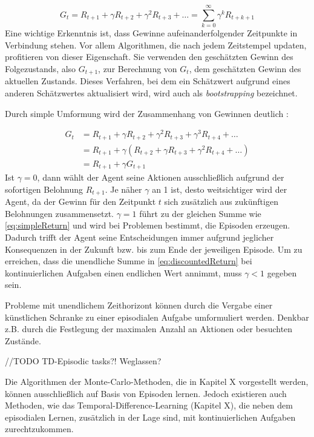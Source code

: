 \begin{equation}\label{eq:discountedReturn}
    G_t = R_{t+1} + \gamma R_{t+2} + \gamma^2 R_{t+3} + \dots  = \sum_{k=0}^\infty{\gamma^k R_{t+k+1}}
\end{equation}
Eine wichtige Erkenntnis ist, dass Gewinne aufeinanderfolgender Zeitpunkte in Verbindung stehen. Vor allem Algorithmen, die nach jedem Zeitstempel updaten, profitieren von dieser Eigenschaft. Sie verwenden den geschätzten Gewinn des Folgezustands, also $G_{t+1}$, zur Berechnung von $G_t$, dem geschätzten Gewinn des aktuellen Zustands. Dieses Verfahren, bei dem ein Schätzwert aufgrund eines anderen Schätzwertes aktualisiert wird, wird auch als \textit{bootstrapping} bezeichnet.  
\par 
Durch simple Umformung wird der Zusammenhang von Gewinnen deutlich \cite[S.55]{Sutton1998}:

\begin{equation}\label{eq:successiveReturn}
    \begin{aligned}
    G_t &= R_{t+1} + \gamma R_{t+2} + \gamma^2 R_{t+3} + \gamma^3 R_{t+4} + \dots \\
    &= R_{t+1} + \gamma (R_{t+2} + \gamma R_{t+3} + \gamma^2 R_{t+4} + \dots)  \\
   & = R_{t+1} + \gamma G_{t+1}
    \end{aligned}
\end{equation}
Ist $\gamma = 0$, dann wählt der Agent seine Aktionen ausschließlich aufgrund der sofortigen Belohnung $R_{t+1}$. Je näher $\gamma$ an 1 ist, desto \glqq weitsichtiger\grqq{} wird der Agent, da der Gewinn für den Zeitpunkt $t$ sich zusätzlich aus zukünftigen Belohnungen zusammensetzt. $\gamma = 1$ führt zu der gleichen Summe wie \eqref{eq:simpleReturn} und wird bei Problemen bestimmt, die Episoden erzeugen. Dadurch trifft der Agent seine Entscheidungen immer aufgrund jeglicher Konsequenzen in der Zukunft bzw. bis zum Ende der jeweiligen Episode. Um zu erreichen, dass die unendliche Summe in \eqref{eq:discountedReturn} bei kontinuierlichen Aufgaben einen endlichen Wert annimmt, muss $\gamma < 1$ gegeben sein.
\par 
Probleme mit unendlichem Zeithorizont können durch die Vergabe einer künstlichen Schranke zu einer episodialen Aufgabe umformuliert werden. Denkbar z.B. durch die Festlegung der maximalen Anzahl an Aktionen oder besuchten Zustände. 
\par 
//TODO TD-Episodic tasks?! Weglassen?
\par
Die Algorithmen der Monte-Carlo-Methoden, die in Kapitel X vorgestellt werden, können ausschließlich auf Basis von Episoden lernen. Jedoch existieren auch Methoden, wie das Temporal-Difference-Learning (Kapitel X), die neben dem episodialen Lernen, zusätzlich in der Lage sind, mit kontinuierlichen Aufgaben zurechtzukommen. 